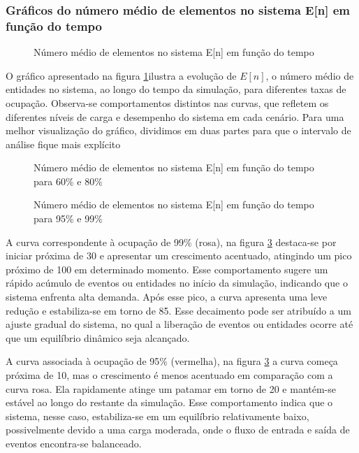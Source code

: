 \subsubsection{Gráficos do número médio de elementos no sistema E[n] em função do tempo}
\begin{figure}[h!]
   \centering
   
   \caption{Número médio de elementos no sistema E[n] em função do tempo}
   \label{fig:eNE1}
\end{figure}
O gráfico apresentado na figura \ref{fig:eNE1}ilustra a evolução de $E[n]$, o número médio de entidades no sistema, ao longo do tempo da simulação, para diferentes taxas de ocupação. Observa-se comportamentos distintos nas curvas, que refletem os diferentes níveis de carga e desempenho do sistema em cada cenário.
Para uma melhor visualização do gráfico, dividimos em duas partes para que o intervalo de análise fique mais explícito
\begin{figure}[h!]
   \centering
   
   \caption{Número médio de elementos no sistema E[n] em função do tempo para 60\% e 80\%}
   \label{fig:eN2E1}
\end{figure}
\begin{figure}[h!]
   \centering
   
   \caption{Número médio de elementos no sistema E[n] em função do tempo para 95\% e 99\%}
   \label{fig:eN3E1}
\end{figure}

A curva correspondente à ocupação de 99\% (rosa), na figura \ref{fig:eN3E1} destaca-se por iniciar próxima de 30 e apresentar um crescimento acentuado, atingindo um pico próximo de 100 em determinado momento. Esse comportamento sugere um rápido acúmulo de eventos ou entidades no início da simulação, indicando que o sistema enfrenta alta demanda. Após esse pico, a curva apresenta uma leve redução e estabiliza-se em torno de 85. Esse decaimento pode ser atribuído a um ajuste gradual do sistema, no qual a liberação de eventos ou entidades ocorre até que um equilíbrio dinâmico seja alcançado.

A curva associada à ocupação de 95\% (vermelha), na figura \ref{fig:eN3E1} a curva começa próxima de 10, mas o crescimento é menos acentuado em comparação com a curva rosa. Ela rapidamente atinge um patamar em torno de 20 e mantém-se estável ao longo do restante da simulação. Esse comportamento indica que o sistema, nesse caso, estabiliza-se em um equilíbrio relativamente baixo, possivelmente devido a uma carga moderada, onde o fluxo de entrada e saída de eventos encontra-se balanceado.

